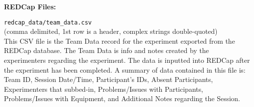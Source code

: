 \begin{description}
\item\textbf{REDCap Files:}
\medskip
\item\verb|redcap_data/team_data.csv|\\(comma delimited, 1st row is a header, complex strings double-quoted)\\
This CSV file is the Team Data record for the experiment exported from the REDCap database. The Team Data is info and notes created by the experimenters regarding the experiment. The data is inputted into REDCap after the experiment has been completed. A summary of data contained in this file is: Team ID, Session Date/Time, Participant's IDs, Absent Participants, Experimenters that subbed-in, Problems/Issues with Participants, Problems/Issues with Equipment, and Additional Notes regarding the Session.


\end{description}
